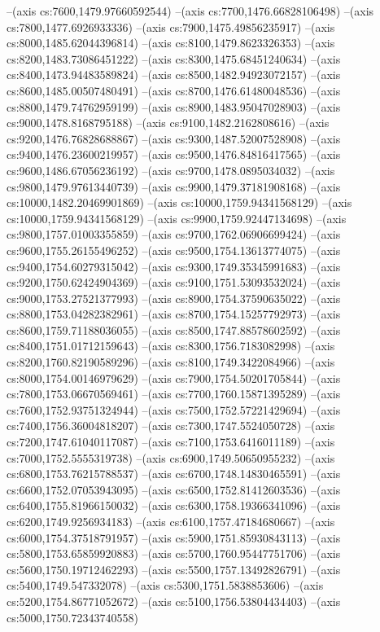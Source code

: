 --(axis cs:7600,1479.97660592544)
--(axis cs:7700,1476.66828106498)
--(axis cs:7800,1477.6926933336)
--(axis cs:7900,1475.49856235917)
--(axis cs:8000,1485.62044396814)
--(axis cs:8100,1479.8623326353)
--(axis cs:8200,1483.73086451222)
--(axis cs:8300,1475.68451240634)
--(axis cs:8400,1473.94483589824)
--(axis cs:8500,1482.94923072157)
--(axis cs:8600,1485.00507480491)
--(axis cs:8700,1476.61480048536)
--(axis cs:8800,1479.74762959199)
--(axis cs:8900,1483.95047028903)
--(axis cs:9000,1478.8168795188)
--(axis cs:9100,1482.2162808616)
--(axis cs:9200,1476.76828688867)
--(axis cs:9300,1487.52007528908)
--(axis cs:9400,1476.23600219957)
--(axis cs:9500,1476.84816417565)
--(axis cs:9600,1486.67056236192)
--(axis cs:9700,1478.0895034032)
--(axis cs:9800,1479.97613440739)
--(axis cs:9900,1479.37181908168)
--(axis cs:10000,1482.20469901869)
--(axis cs:10000,1759.94341568129)
--(axis cs:10000,1759.94341568129)
--(axis cs:9900,1759.92447134698)
--(axis cs:9800,1757.01003355859)
--(axis cs:9700,1762.06906699424)
--(axis cs:9600,1755.26155496252)
--(axis cs:9500,1754.13613774075)
--(axis cs:9400,1754.60279315042)
--(axis cs:9300,1749.35345991683)
--(axis cs:9200,1750.62424904369)
--(axis cs:9100,1751.53093532024)
--(axis cs:9000,1753.27521377993)
--(axis cs:8900,1754.37590635022)
--(axis cs:8800,1753.04282382961)
--(axis cs:8700,1754.15257792973)
--(axis cs:8600,1759.71188036055)
--(axis cs:8500,1747.88578602592)
--(axis cs:8400,1751.01712159643)
--(axis cs:8300,1756.7183082998)
--(axis cs:8200,1760.82190589296)
--(axis cs:8100,1749.3422084966)
--(axis cs:8000,1754.00146979629)
--(axis cs:7900,1754.50201705844)
--(axis cs:7800,1753.06670569461)
--(axis cs:7700,1760.15871395289)
--(axis cs:7600,1752.93751324944)
--(axis cs:7500,1752.57221429694)
--(axis cs:7400,1756.36004818207)
--(axis cs:7300,1747.5524050728)
--(axis cs:7200,1747.61040117087)
--(axis cs:7100,1753.6416011189)
--(axis cs:7000,1752.5555319738)
--(axis cs:6900,1749.50650955232)
--(axis cs:6800,1753.76215788537)
--(axis cs:6700,1748.14830465591)
--(axis cs:6600,1752.07053943095)
--(axis cs:6500,1752.81412603536)
--(axis cs:6400,1755.81966150032)
--(axis cs:6300,1758.19366341096)
--(axis cs:6200,1749.9256934183)
--(axis cs:6100,1757.47184680667)
--(axis cs:6000,1754.37518791957)
--(axis cs:5900,1751.85930843113)
--(axis cs:5800,1753.65859920883)
--(axis cs:5700,1760.95447751706)
--(axis cs:5600,1750.19712462293)
--(axis cs:5500,1757.13492826791)
--(axis cs:5400,1749.547332078)
--(axis cs:5300,1751.5838853606)
--(axis cs:5200,1754.86771052672)
--(axis cs:5100,1756.53804434403)
--(axis cs:5000,1750.72343740558)
